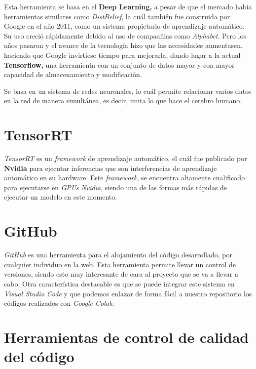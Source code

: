 Esta herramienta se basa en el \textbf{Deep Learning,} a pesar de que el mercado habia herramientas similares como \textit{DistBelief}\cite{distBelief}, la cuál también fue construida por Google en el año 2011, como un sistema propietario de aprendizaje automático. Su uso creció rápidamente debido al uso de compaañias como \textit{Alphabet}. Pero los años pasaron y el avance de la tecnología 
hizo que las necesidades aumentasen, haciendo que Google invirtiese tiempo para mejorarla, dando lugar a la actual \textbf{Tensorflow,} una herramienta con un conjunto de datos mayor y con mayor capacidad de almacenamiento y modificación.

Se basa en un sistema de redes neuronales, lo cuál permite relacionar varios datos en la red de manera simultánea, es decir, imita lo que hace el cerebro humano.

\section{TensorRT}
\textit{TensorRT}\cite{tensorrt} es un \textit{framework} de aprendizaje automático, el cuál fue publicado por \textbf{Nvidia} para ejecutar inferencias que son interferencias de aprendizaje automático en su hardware. Este \textit{framework}, se encuentra altamente cualificado para ejecutarse en \textit{GPUs Nvidia}, siendo una de las formas más rápidas de ejecutar un modelo en este momento.


\section{GitHub}
\textit{GitHub}\cite{github} es una herramienta para el alojamiento del código desarrollado, por cualquier individuo en la web. Esta herramienta permite llevar un control de versiones, siendo esto muy interesante de cara al proyecto que se va a llevar a cabo.
Otra característica destacable es que se puede integrar este sistema en \textit{Visual Studio Code}\cite{visualStudioCode} y que podemos enlazar de forma fácil a nuestro repositorio los códigos realizados con \textit{Google Colab}\cite{colab}.

\section{Herramientas de control de calidad del código}
